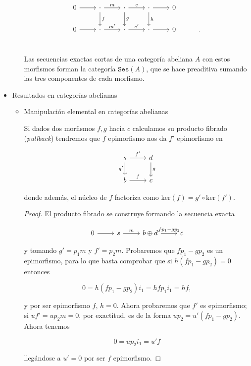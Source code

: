 \documentclass[11pt]{article}
\begin{document}
\begin{itemize}
\begin{itemize}
\begin{definition}
\[\begin{tikzcd}
0 \rar& 
\cdot \rar{m}\dar{f}& 
\cdot \rar{e}\dar{g}& 
\cdot \rar\dar{h}& 
0 \\
0 \rar& 
\cdot \rar{m'}& 
\cdot \rar{e'}& 
\cdot \rar& 
0 & .\\
\end{tikzcd}\]

Las secuencias exactas cortas de una categoría abeliana $A$ con estos 
morfismos forman la categoría $\mathtt{Ses}(A)$, que se hace preaditiva sumando
las tres componentes de cada morfismo.
\end{definition}
\end{itemize}

\item Resultados en categorías abelianas
\label{sec-7-5-4-6}
\begin{itemize}
\item Manipulación elemental en categorías abelianas
\label{sec-7-5-4-6-1}
\begin{proposition}
Si dados dos morfismos $f,g$ hacia $c$ calculamos su producto fibrado
(\emph{pullback}) tendremos que $f$ epimorfismo nos da $f'$ epimorfismo en

\[\begin{tikzcd}
s\rar{f'} \dar[swap]{g'} & d \dar{g} \\
b\rar{f} & c
\end{tikzcd}\]

donde además, el núcleo de $f$ factoriza como $\mathrm{ker}(f) = g'\circ \mathrm{ker}(f')$.
\end{proposition}
\begin{proof}
El producto fibrado se construye formando la secuencia exacta

\[\begin{tikzcd}
0\rar&s\rar{m}&b\oplus d\rar{fp_1-gp_2}& c
\end{tikzcd}\]

y tomando $g' = p_1m$ y $f'=p_2m$. Probaremos que $fp_1-gp_2$ es un
epimorfismo, para lo que basta comprobar que si $h(fp_1-gp_2) = 0$
entonces

\[
0 = h(fp_1-gp_2)i_1 = hfp_1i_1 = hf,
\]

y por ser epimorfismo $f$, $h = 0$. Ahora probaremos que $f'$ es
epimorfismo; si $uf'=up_2m=0$, por exactitud, es de la forma
$up_2 = u'(fp_1-gp_2)$. Ahora tenemos

\[
0 = up_2i_1 = u'f
\]

llegándose a $u'=0$ por ser $f$ epimorfismo.
\end{proof}


\end{itemize}
\end{itemize}
\end{document}
